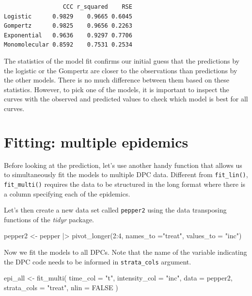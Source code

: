 \documentclass[
  letterpaper,
  DIV=11,
  numbers=noendperiod]{scrreprt}
\newenvironment{Shaded}{\begin{snugshade}}{\end{snugshade}}
\newcommand{\AttributeTok}[1]{\textcolor[rgb]{0.40,0.45,0.13}{#1}}
\newcommand{\ConstantTok}[1]{\textcolor[rgb]{0.56,0.35,0.01}{#1}}
\newcommand{\DecValTok}[1]{\textcolor[rgb]{0.68,0.00,0.00}{#1}}
\newcommand{\FunctionTok}[1]{\textcolor[rgb]{0.28,0.35,0.67}{#1}}
\newcommand{\NormalTok}[1]{\textcolor[rgb]{0.00,0.23,0.31}{#1}}
\newcommand{\OtherTok}[1]{\textcolor[rgb]{0.00,0.23,0.31}{#1}}
\newcommand{\SpecialCharTok}[1]{\textcolor[rgb]{0.37,0.37,0.37}{#1}}
\newcommand{\StringTok}[1]{\textcolor[rgb]{0.13,0.47,0.30}{#1}}
\begin{document}
\begin{verbatim}
                 CCC r_squared    RSE
Logistic      0.9829    0.9665 0.6045
Gompertz      0.9825    0.9656 0.2263
Exponential   0.9636    0.9297 0.7706
Monomolecular 0.8592    0.7531 0.2534
\end{verbatim}

The statistics of the model fit confirms our initial guess that the
predictions by the logistic or the Gompertz are closer to the
observations than predictions by the other models. There is no much
difference between them based on these statistics. However, to pick one
of the models, it is important to inspect the curves with the observed
and predicted values to check which model is best for all curves.

\hypertarget{fitting-multiple-epidemics}{%
\section{Fitting: multiple epidemics}\label{fitting-multiple-epidemics}}

Before looking at the prediction, let's use another handy function that
allows us to simultaneously fit the models to multiple DPC data.
Different from \texttt{fit\_lin()}, \texttt{fit\_multi()} requires the
data to be structured in the long format where there is a column
specifying each of the epidemics.

Let's then create a new data set called \texttt{pepper2} using the data
transposing functions of the \emph{tidyr} package.

\begin{Shaded}
\begin{Highlighting}[]
\NormalTok{pepper2 }\OtherTok{\textless{}{-}}\NormalTok{ pepper }\SpecialCharTok{|\textgreater{}} 
  \FunctionTok{pivot\_longer}\NormalTok{(}\DecValTok{2}\SpecialCharTok{:}\DecValTok{4}\NormalTok{, }\AttributeTok{names\_to =}\StringTok{"treat"}\NormalTok{, }\AttributeTok{values\_to =} \StringTok{"inc"}\NormalTok{)}
\end{Highlighting}
\end{Shaded}

Now we fit the models to all DPCs. Note that the name of the variable
indicating the DPC code needs to be informed in \texttt{strata\_cols}
argument.

\begin{Shaded}
\begin{Highlighting}[]
\NormalTok{epi\_all }\OtherTok{\textless{}{-}} \FunctionTok{fit\_multi}\NormalTok{(}
  \AttributeTok{time\_col =} \StringTok{"t"}\NormalTok{,}
  \AttributeTok{intensity\_col =} \StringTok{"inc"}\NormalTok{,}
  \AttributeTok{data =}\NormalTok{ pepper2,}
  \AttributeTok{strata\_cols =} \StringTok{"treat"}\NormalTok{,}
  \AttributeTok{nlin =} \ConstantTok{FALSE}
\NormalTok{)}
\end{Highlighting}
\end{Shaded}
\end{document}
